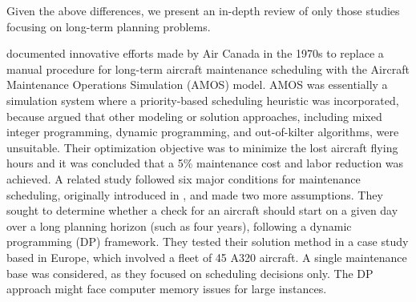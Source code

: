 Given the above differences, we present an in-depth review of only those studies focusing on long-term planning problems.


\cite{boere1977air} documented innovative efforts made by Air Canada in the 1970s to replace a manual procedure for long-term aircraft maintenance scheduling with the Aircraft Maintenance Operations Simulation (AMOS) model. AMOS was essentially a simulation system where a priority-based scheduling heuristic was incorporated, because \cite{boere1977air} argued that other modeling or solution approaches, including mixed integer programming, dynamic programming, and out-of-kilter algorithms, were unsuitable. Their optimization objective was to minimize the lost aircraft flying hours and it was concluded that a 5\% maintenance cost and labor reduction was achieved. A related study \cite{deng2020practical} followed six major conditions for maintenance scheduling, originally introduced in \cite{boere1977air}, and made two more assumptions. They sought to determine whether a check for an aircraft should start on a given day over a long planning horizon (such as four years), following a dynamic programming (DP) framework. They tested their solution method in a case study based in Europe, which involved a fleet of 45 A320 aircraft. A single maintenance base was considered, as they focused on scheduling decisions only. The DP approach might face computer memory issues for large instances. 


